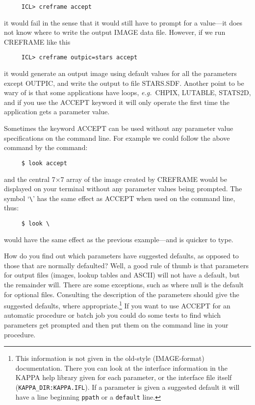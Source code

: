 \small
\begin{verbatim}
     ICL> creframe accept
\end{verbatim}
\normalsize
it would fail in the sense that it would still have to prompt for a
value---it does not know where to write the output IMAGE
data file.  However, if we run CREFRAME like this

\small
\begin{verbatim}
     ICL> creframe outpic=stars accept
\end{verbatim}
\normalsize
it would generate an output image using default values for all the
parameters except OUTPIC, and write the output to file STARS.SDF.
Another point to be wary of is that some applications have loops,
{\it e.g.}\ CHPIX, LUTABLE, STATS2D, and if you use the ACCEPT keyword
it will only operate the first time the application gets a parameter
value.

Sometimes the keyword ACCEPT can be used without any parameter value
specifications on the command line.
For example we could follow the above command by the command:

\small
\begin{verbatim}
     $ look accept
\end{verbatim}
\normalsize
and the central 7$\times$7 array of the image created by CREFRAME would be
displayed on your terminal without any parameter values being prompted.
The symbol `\verb+\+' has the same effect as ACCEPT when used on the
command line, thus:

\small
\begin{verbatim}
     $ look \
\end{verbatim}
\normalsize
would have the same effect as the previous example---and is quicker
to type.

How do you find out which parameters have suggested defaults, as opposed
to those that are normally defaulted?  Well, a good rule of thumb is
that parameters for output files (images, lookup tables and ASCII) will
not have a default, but the remainder will.  There are some exceptions,
such as where null is the default for optional files.  Consulting the
description of the parameters should give the suggested defaults, where
appropriate.\footnote{This information is not given in the old-style
(IMAGE-format) documentation.  There you can look at the
interface information in the KAPPA help library given for each
parameter, or the interface file itself ({\tt KAPPA\_DIR:KAPPA.IFL}).
If a parameter is given a suggested default it will have a line
beginning {\tt ppath} or a {\tt default} line.}  If you want to use
ACCEPT for an automatic procedure or batch job you could do some tests
to find which parameters get prompted and then put them on the command
line in your procedure. 

